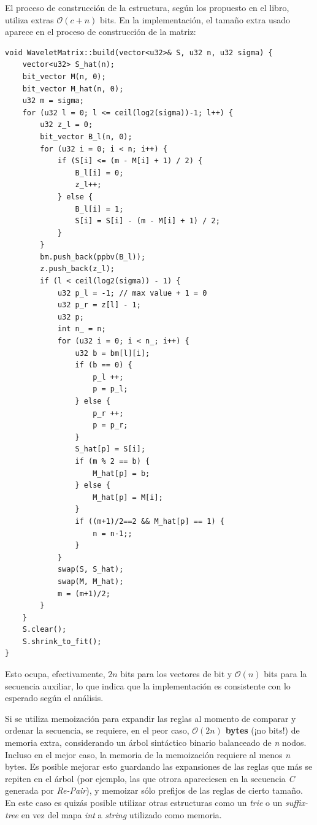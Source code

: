 El proceso de construcción de la estructura, según los propuesto en el libro, utiliza extras $\mathcal{O}(c + n)$ bits. En la implementación, el tamaño extra usado aparece en el proceso de construcción de la matriz:
\begin{lstlisting}[style=cppstyle, caption={Construccion de matriz}, label={lst:wm-build}] 
void WaveletMatrix::build(vector<u32>& S, u32 n, u32 sigma) {
    vector<u32> S_hat(n);
    bit_vector M(n, 0);
    bit_vector M_hat(n, 0);
    u32 m = sigma;
    for (u32 l = 0; l <= ceil(log2(sigma))-1; l++) {    
        u32 z_l = 0;
        bit_vector B_l(n, 0);
        for (u32 i = 0; i < n; i++) {
            if (S[i] <= (m - M[i] + 1) / 2) { 
                B_l[i] = 0;
                z_l++;
            } else {
                B_l[i] = 1;
                S[i] = S[i] - (m - M[i] + 1) / 2;
            }
        }
        bm.push_back(ppbv(B_l));
        z.push_back(z_l);
        if (l < ceil(log2(sigma)) - 1) {
            u32 p_l = -1; // max value + 1 = 0
            u32 p_r = z[l] - 1;
            u32 p;
            int n_ = n;
            for (u32 i = 0; i < n_; i++) {
                u32 b = bm[l][i];
                if (b == 0) {                    
                    p_l ++;  
                    p = p_l;
                } else {                    
                    p_r ++;
                    p = p_r;              
                }
                S_hat[p] = S[i];
                if (m % 2 == b) {
                    M_hat[p] = b;
                } else {
                    M_hat[p] = M[i];
                }
                if ((m+1)/2==2 && M_hat[p] == 1) {
                    n = n-1;;
                }
            }        
            swap(S, S_hat);
            swap(M, M_hat);
            m = (m+1)/2;
        }
    }
    S.clear();
    S.shrink_to_fit();
}
\end{lstlisting}
Esto ocupa, efectivamente, $2 n$ bits para los vectores de bit y $\mathcal{O}(n)$ bits para la secuencia auxiliar, lo que indica que la implementación es consistente con lo esperado según el análisis.

Si se utiliza memoización para expandir las reglas al momento de comparar y ordenar la secuencia, se requiere, en el peor caso, $\mathcal{O}(2n)$ \textbf{bytes} (¡no bits!) de memoria extra, considerando un árbol sintáctico binario balanceado de \textit{n} nodos. Incluso en el mejor caso, la memoria de la memoización requiere al menos \textit{n} bytes. Es posible mejorar esto guardando las expansiones de las reglas que más se repiten en el árbol (por ejemplo, las que otrora apareciesen en la secuencia \textit{C} generada por \textit{Re-Pair}), y memoizar sólo prefijos de las reglas de cierto tamaño. En este caso es quizás posible utilizar otras estructuras como un \textit{trie} o un \textit{suffix-tree} en vez del mapa \textit{int} a \textit{string} utilizado como memoria.

